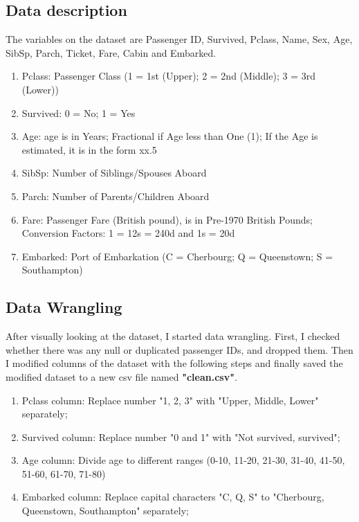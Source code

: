 \documentclass[10pt, a4paper, twocolumn]{article} %
\begin{document}
\subsection{Data description}

The variables on the dataset are Passenger ID, Survived, Pclass, Name, Sex, Age, SibSp, Parch, Ticket, Fare, Cabin and Embarked. 

\begin{enumerate}
	\item Pclass: Passenger Class (1 = 1st (Upper); 2 = 2nd (Middle); 3 = 3rd (Lower))
	\item Survived: 0 = No; 1 = Yes
	\item Age: age is in Years; Fractional if Age less than One (1); If the Age is estimated, it is in the form xx.5
	\item SibSp: Number of Siblings/Spouses Aboard 
	\item Parch: Number of Parents/Children Aboard
	\item Fare: Passenger Fare (British pound), is in Pre-1970 British Pounds;  Conversion Factors: 1 = 12s = 240d and 1s = 20d
	\item Embarked: Port of Embarkation (C = Cherbourg; Q = Queenstown; S = Southampton)
\end{enumerate}


\subsection{Data Wrangling}

After visually looking at the dataset, I started data wrangling. First, I checked whether there was any null or duplicated passenger IDs, and dropped them.  Then I modified columns of the dataset with the following steps and finally saved the modified dataset to a new csv file named \textbf{"clean.csv"}.
\begin{enumerate}
	\item Pclass column: Replace number "1, 2, 3" with "Upper, Middle, Lower" separately; 
	\item Survived column: Replace number "0 and 1" with "Not survived, survived";  
	\item Age column: Divide age to different ranges (0-10, 11-20, 21-30, 31-40, 41-50, 51-60, 61-70, 71-80)
	\item Embarked column: Replace capital characters "C, Q, S" to "Cherbourg, Queenstown, Southampton" separately;
\end{enumerate}
\end{document}
